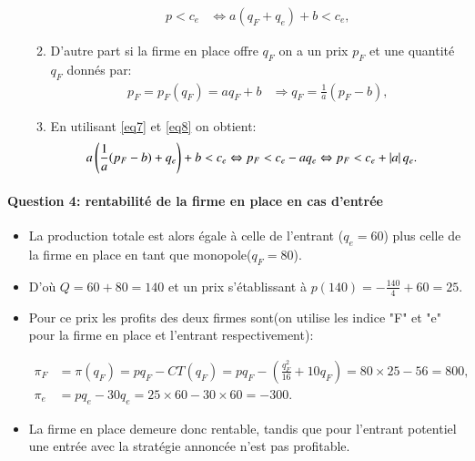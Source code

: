 \documentclass[notes, ignorenonframetext, compress, 9pt, xcolor=svgnames, aspectratio=169]{beamer}
\begin{document}
\begin{frame}
\begin{itemize}
\begin{enumerate}[$\cdot$]
\begin{align}
p < c_e &\Leftrightarrow  a(q_F + q_e ) + b < c_e,
\label{eq7}
\end{align}
\item D'autre part si la firme en place offre $q_F$ on a un prix $p_F$ et une quantité $q_F$ donnés par:
\begin{align}
p_F = p_F(q_F) = aq_F+ b  &\Rightarrow q_F = \frac{1}{a}(p_F - b),
\label{eq8}
\end{align}
\item En utilisant \eqref{eq7} et \eqref{eq8} on obtient:
\begin{align*}
a\left( \frac{1}{a}(p_F - b) +  q_e \right) + b < c_e &\Leftrightarrow  p_F < c_e - aq_e \Leftrightarrow p_F < c_e + \left\vert {a} \right\vert q_e.
\end{align*}
\end{enumerate}
\end{itemize}
\end{frame}

\begin{frame}
[allowframebreaks]{\insertsection}
\framesubtitle{Question 4: rentabilité de la firme en place en cas d'entrée}
\begin{itemize}
\item La production totale est alors égale à celle de l’entrant ($q_e = 60$) plus celle de
 la firme en place  en tant que monopole($q_F = 80$).
\item D'où $Q = 60+80 = 140$ et un prix s'établissant à $p(140) =  - \frac{140}{4} +60 = 25$.
\item Pour ce prix les profits des deux firmes sont(on utilise les indice "F" et "e" pour la firme en place et l'entrant respectivement):

\begin{align*}
\pi_F &= \pi(q_F) = pq_F - CT(q_F) = pq_F-(\frac{q_F^2}{16} + 10q_F) = 80\times 25 - 56 = 800,\\
\pi_e &= pq_e - 30 q_e= 25\times 60 - 30\times 60 = -300.
\end{align*}
\item La firme en place demeure donc rentable, tandis que pour l'entrant potentiel une entrée avec la stratégie annoncée n'est pas profitable.
\end{itemize}
\end{frame}
\end{document}
